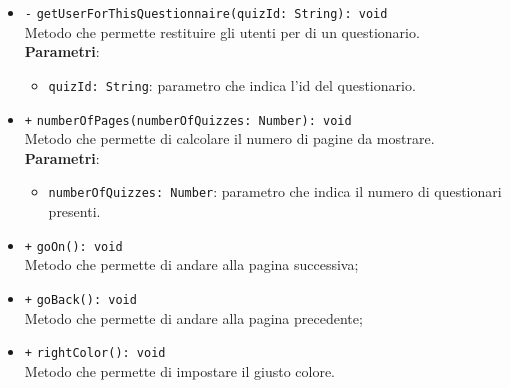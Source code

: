 \begin{itemize}
\begin{itemize}
		
		\item \texttt{-} \texttt{getUserForThisQuestionnaire(quizId: String): void} \\ Metodo che permette restituire gli utenti per di un questionario. \\
		\textbf{Parametri}:
		\begin{itemize}
			\item \texttt{quizId: String}: parametro che indica l'id del questionario.
		\end{itemize}
		\item \texttt{+} \texttt{numberOfPages(numberOfQuizzes: Number): void} \\ Metodo che permette di calcolare il numero di pagine da mostrare. \\
		\textbf{Parametri}:
		\begin{itemize}
			\item \texttt{numberOfQuizzes: Number}: parametro che indica il numero di questionari presenti.
		\end{itemize}
		\item \texttt{+} \texttt{goOn(): void} \\ Metodo che permette di andare alla pagina successiva; \\
		\item \texttt{+} \texttt{goBack(): void} \\ Metodo che permette di andare alla pagina precedente; \\
		\item \texttt{+} \texttt{rightColor(): void} \\ Metodo che permette di impostare il giusto colore. \\
		
	\end{itemize}
\end{itemize}

